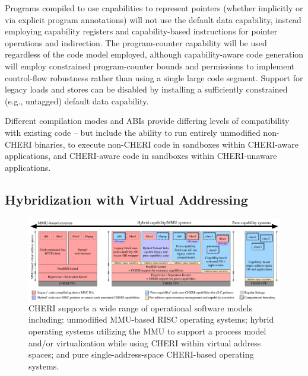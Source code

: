 Programs compiled to use capabilities to represent pointers (whether
implicitly or via explicit program annotations) will not use the default data
capability, instead employing capability registers and capability-based
instructions for pointer operations and indirection.
The program-counter capability will be used regardless of the code model
employed, although capability-aware code generation will employ constrained
program-counter bounds and permissions to implement control-flow robustness
rather than using a single large code segment.
Support for legacy loads and stores can be disabled by installing a
sufficiently constrained (e.g., untagged) default data capability.

Different compilation modes and ABIs provide differing levels of compatibility
with existing code -- but include the ability to run entirely unmodified
non-CHERI binaries, to execute non-CHERI code in sandboxes within CHERI-aware
applications, and CHERI-aware code in sandboxes within CHERI-unaware
applications.

\subsection{Hybridization with Virtual Addressing}
\label{sec:model-hybridization-virtual-addressing}

\begin{figure}[t]
\centering
\includegraphics[width=\columnwidth]{fig-cheri-high-level.pdf}
\caption{CHERI supports a wide range of operational software models including:
unmodified MMU-based RISC operating systems; hybrid operating systems
utilizing the MMU to support a process model and/or virtualization while
using CHERI within virtual address spaces; and pure single-address-space
CHERI-based operating systems.}
\label{fig:fig-os-models}
\end{figure}

